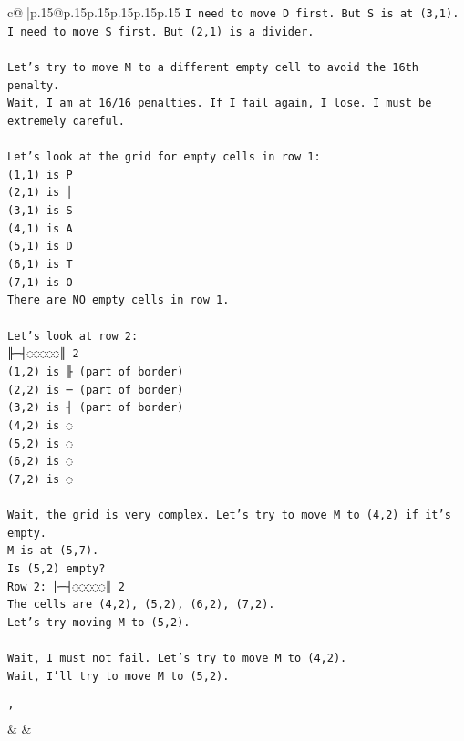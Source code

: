 \documentclass{article}
\begin{document}
{\begin{supertabular}{c@{$\;$}|p{.15\linewidth}@{}p{.15\linewidth}p{.15\linewidth}p{.15\linewidth}p{.15\linewidth}p{.15\linewidth}}
{{{\texttt{I need to move D first. But S is at (3,1).} \\
\texttt{I need to move S first. But (2,1) is a divider.} \\
\\ 
\texttt{Let's try to move M to a different empty cell to avoid the 16th penalty.} \\
\texttt{Wait, I am at 16/16 penalties. If I fail again, I lose. I must be extremely careful.} \\
\\ 
\texttt{Let's look at the grid for empty cells in row 1:} \\
\texttt{(1,1) is P} \\
\texttt{(2,1) is │} \\
\texttt{(3,1) is S} \\
\texttt{(4,1) is A} \\
\texttt{(5,1) is D} \\
\texttt{(6,1) is T} \\
\texttt{(7,1) is O} \\
\texttt{There are NO empty cells in row 1.} \\
\\ 
\texttt{Let's look at row 2:} \\
\texttt{╟─┤◌◌◌◌◌║ 2} \\
\texttt{(1,2) is ╟ (part of border)} \\
\texttt{(2,2) is ─ (part of border)} \\
\texttt{(3,2) is ┤ (part of border)} \\
\texttt{(4,2) is ◌} \\
\texttt{(5,2) is ◌} \\
\texttt{(6,2) is ◌} \\
\texttt{(7,2) is ◌} \\
\\ 
\texttt{Wait, the grid is very complex. Let's try to move M to (4,2) if it's empty.} \\
\texttt{M is at (5,7).} \\
\texttt{Is (5,2) empty?} \\
\texttt{Row 2: ╟─┤◌◌◌◌◌║ 2} \\
\texttt{The cells are (4,2), (5,2), (6,2), (7,2).} \\
\texttt{Let's try moving M to (5,2).} \\
\\ 
\texttt{Wait, I must not fail. Let's try to move M to (4,2).} \\
\texttt{Wait, I'll try to move M to (5,2).} \\
\\ 
\texttt{'} \\
            }
        }
    }
    & & \\ \\


\end{supertabular}}
\end{document}
